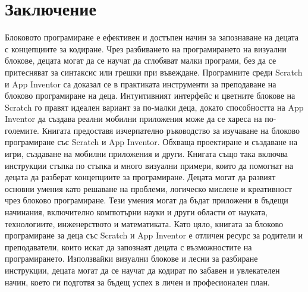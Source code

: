 \chapter*{Заключение}
\thispagestyle{empty}

Блоковото програмиране е ефективен и достъпен начин за запознаване на децата с концепциите за кодиране. Чрез разбиването на програмирането на визуални блокове, децата могат да се научат да сглобяват малки програми, без да се притесняват за синтаксис или грешки при въвеждане. Програмните среди Scratch и App Inventor са доказал се в практиката инструменти за преподаване на блоково програмиране на деца. Интуитивният интерфейс и цветните блокове на Scratch го правят идеален вариант за по-малки деца, докато способността на App Inventor да създава реални мобилни приложения може да се хареса на по-големите. Книгата предоставя изчерпателно ръководство за изучаване на блоково програмиране със Scratch и App Inventor. Обхваща проектиране и създаване на игри, създаване на мобилни приложения и други. Книгата също така включва инструкции стъпка по стъпка и много визуални примери, които да помогнат на децата да разберат концепциите за програмиране. Децата могат да развият основни умения като решаване на проблеми, логическо мислене и креативност чрез блоково програмиране. Тези умения могат да бъдат приложени в бъдещи начинания, включително компютърни науки и други области от науката, технологиите, инженерството и математиката. Като цяло, книгата за блоково програмиране за деца със Scratch и App Inventor е отличен ресурс за родители и преподаватели, които искат да запознаят децата с възможностите на програмирането. Използвайки визуални блокове и лесни за разбиране инструкции, децата могат да се научат да кодират по забавен и увлекателен начин, което ги подготвя за бъдещ успех в личен и професионален план.

